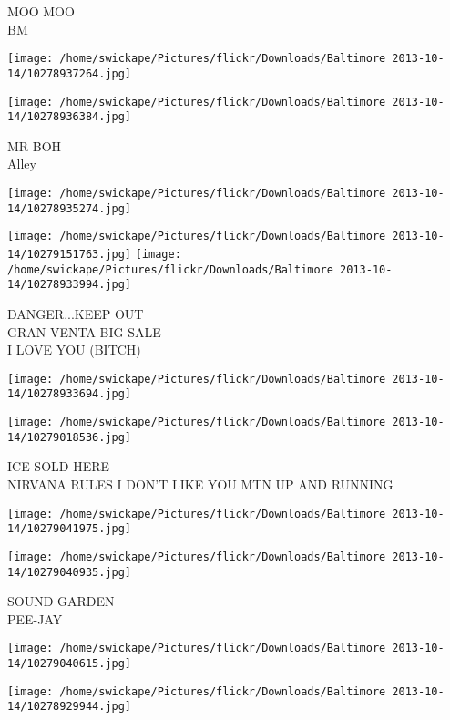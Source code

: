 \documentclass[10pt,letterpaper]{article}
\begin{document}
MOO MOO\\
BM
\pagebreak

\texttt{[image: /home/swickape/Pictures/flickr/Downloads/Baltimore 2013-10-14/10278937264.jpg]}

\vspace{0.25in}
\texttt{[image: /home/swickape/Pictures/flickr/Downloads/Baltimore 2013-10-14/10278936384.jpg]}

MR BOH\\
Alley
\pagebreak

\texttt{[image: /home/swickape/Pictures/flickr/Downloads/Baltimore 2013-10-14/10278935274.jpg]}

\vspace{0.25in}
\texttt{[image: /home/swickape/Pictures/flickr/Downloads/Baltimore 2013-10-14/10279151763.jpg]}
\texttt{[image: /home/swickape/Pictures/flickr/Downloads/Baltimore 2013-10-14/10278933994.jpg]}

DANGER...KEEP OUT\\
GRAN VENTA BIG SALE\\
I LOVE YOU (BITCH)
\pagebreak

\texttt{[image: /home/swickape/Pictures/flickr/Downloads/Baltimore 2013-10-14/10278933694.jpg]}

\vspace{0.25in}
\texttt{[image: /home/swickape/Pictures/flickr/Downloads/Baltimore 2013-10-14/10279018536.jpg]}

ICE SOLD HERE\\
NIRVANA RULES I DON'T LIKE YOU MTN UP AND RUNNING
\pagebreak

\texttt{[image: /home/swickape/Pictures/flickr/Downloads/Baltimore 2013-10-14/10279041975.jpg]}

\vspace{0.25in}
\texttt{[image: /home/swickape/Pictures/flickr/Downloads/Baltimore 2013-10-14/10279040935.jpg]}

SOUND GARDEN\\
PEE{-}JAY
\pagebreak

\texttt{[image: /home/swickape/Pictures/flickr/Downloads/Baltimore 2013-10-14/10279040615.jpg]}

\vspace{0.25in}
\texttt{[image: /home/swickape/Pictures/flickr/Downloads/Baltimore 2013-10-14/10278929944.jpg]}
\end{document}
